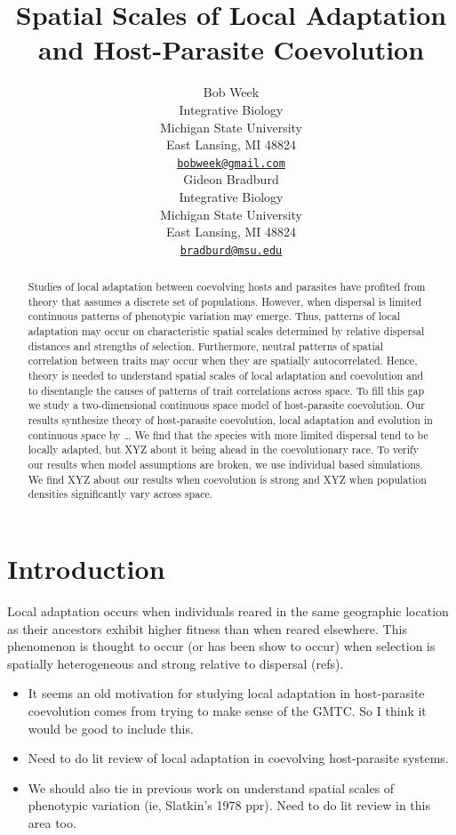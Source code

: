 \documentclass{article}
\title{Spatial Scales of Local Adaptation and Host-Parasite Coevolution}
\author{
    Bob Week
   \\
    Integrative Biology \\
    Michigan State University \\
  East Lansing, MI 48824 \\
  \texttt{\href{mailto:bobweek@gmail.com}{\nolinkurl{bobweek@gmail.com}}} \\
   \And
    Gideon Bradburd
   \\
    Integrative Biology \\
    Michigan State University \\
  East Lansing, MI 48824 \\
  \texttt{\href{mailto:bradburd@msu.edu}{\nolinkurl{bradburd@msu.edu}}} \\
  }
\begin{document}
\maketitle

\def\tightlist{}


\begin{abstract}
Studies of local adaptation between coevolving hosts and parasites have
profited from theory that assumes a discrete set of populations.
However, when dispersal is limited continuous patterns of phenotypic
variation may emerge. Thus, patterns of local adaptation may occur on
characteristic spatial scales determined by relative dispersal distances
and strengths of selection. Furthermore, neutral patterns of spatial
correlation between traits may occur when they are spatially
autocorrelated. Hence, theory is needed to understand spatial scales of
local adaptation and coevolution and to disentangle the causes of
patterns of trait correlations across space. To fill this gap we study a
two-dimensional continuous space model of host-parasite coevolution. Our
results synthesize theory of host-parasite coevolution, local adaptation
and evolution in continuous space by \ldots{} We find that the species
with more limited dispersal tend to be locally adapted, but XYZ about it
being ahead in the coevolutionary race. To verify our results when model
assumptions are broken, we use individual based simulations. We find XYZ
about our results when coevolution is strong and XYZ when population
densities significantly vary across space.
\end{abstract}


\hypertarget{introduction}{%
\section{Introduction}\label{introduction}}

Local adaptation occurs when individuals reared in the same geographic
location as their ancestors exhibit higher fitness than when reared
elsewhere. This phenomenon is thought to occur (or has been show to
occur) when selection is spatially heterogeneous and strong relative to
dispersal (refs).

\begin{itemize}
\item
  It seems an old motivation for studying local adaptation in
  host-parasite coevolution comes from trying to make sense of the GMTC.
  So I think it would be good to include this.
\item
  Need to do lit review of local adaptation in coevolving host-parasite
  systems.
\item
  We should also tie in previous work on understand spatial scales of
  phenotypic variation (ie, Slatkin's 1978 ppr). Need to do lit review
  in this area too.
\end{itemize}
\end{document}
